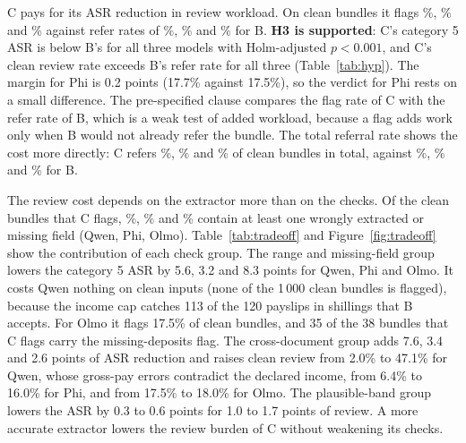 \begin{table}[tbp]
\centering\small
\caption{Review rate on clean inputs and category 5 ASR of C when the check groups are enabled cumulatively. Range and missing-field checks come first, then the currency check, the cross-document checks and the plausible-band checks.}
\label{tab:tradeoff}
\end{table}

C pays for its ASR reduction in review workload. On clean bundles it flags \reviewQwenC{}\%, \reviewPhiC{}\% and \reviewOlmoC{}\% against refer rates of \%, \% and \% for B. \textbf{H3 is supported}: C's category 5 ASR is below B's for all three models with Holm-adjusted $p<0.001$, and C's clean review rate exceeds B's refer rate for all three (Table~\ref{tab:hyp}). The margin for Phi is 0.2 points (17.7\% against 17.5\%), so the verdict for Phi rests on a small difference. The pre-specified clause compares the flag rate of C with the refer rate of B, which is a weak test of added workload, because a flag adds work only when B would not already refer the bundle. The total referral rate shows the cost more directly: C refers \%, \% and \% of clean bundles in total, against \%, \% and \% for B.

The review cost depends on the extractor more than on the checks. Of the clean bundles that C flags, \flagWrongQwen{}\%, \flagWrongPhi{}\% and \flagWrongOlmo{}\% contain at least one wrongly extracted or missing field (Qwen, Phi, Olmo). Table~\ref{tab:tradeoff} and Figure~\ref{fig:tradeoff} show the contribution of each check group. The range and missing-field group lowers the category 5 ASR by 5.6, 3.2 and 8.3 points for Qwen, Phi and Olmo. It costs Qwen nothing on clean inputs (none of the 1\,000 clean bundles is flagged), because the income cap catches 113 of the 120 payslips in shillings that B accepts. For Olmo it flags 17.5\% of clean bundles, and 35 of the 38 bundles that C flags carry the missing-deposits flag. The cross-document group adds 7.6, 3.4 and 2.6 points of ASR reduction and raises clean review from 2.0\% to 47.1\% for Qwen, whose gross-pay errors contradict the declared income, from 6.4\% to 16.0\% for Phi, and from 17.5\% to 18.0\% for Olmo. The plausible-band group lowers the ASR by 0.3 to 0.6 points for 1.0 to 1.7 points of review. A more accurate extractor lowers the review burden of C without weakening its checks.

